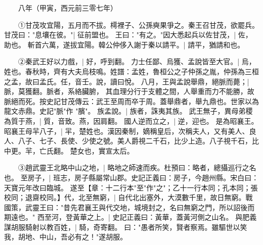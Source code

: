 　　八年（甲寅，西元前三零七年）

　　①甘茂攻宜陽，五月而不拔。樗裡子、公孫奭果爭之。秦王召甘茂，欲罷兵。甘茂曰："息壤在彼。"|{
	征前盟也。
	}
王曰："有之。"因大悉起兵以佐甘茂，|{
	佐，助也。
	}
斬首六萬，遂拔宜陽。韓公仲侈入謝于秦以請平。|{
	請平，猶請和也。
	}

　　②秦武王好以力戲，|{
	好，呼到翻。
	}
力士任鄙、烏獲、孟說皆至大官。|{
	烏，姓也。春秋時，齊有大夫烏枝鳴。姓譜：孟姓，魯桓公之子仲孫之胤，仲孫為三桓之孟，故曰孟氏。任，音壬。說，讀曰悅。
	}
八月，王與孟說舉鼎，絕脈而薨；|{
	脈，莫獲翻。脈者，系絡臟腑， 其血理分行于支體之間，人舉重而力不能勝，故脈絕而死。按史記甘茂傳云：武王至周而卒于周。蓋舉鼎者，舉九鼎也。世家以為龍文赤鼎。史記"脈"作 "臏"。
	}
族孟說。|{
	族者，誅夷其族。
	}
武王無子，異母弟稷為質于燕，|{
	質，音致。燕，因肩翻。
	}
國人逆而立之，|{
	逆，迎也。
	}
是為昭襄王。昭襄王母羋八子，|{
	羋，楚姓也。漢因秦制，嫡稱皇后，次稱夫人，又有美人、良人、八子、七子、長使、少使之號。美人爵視二千石，比少上造。八子視千石，比中更。羋，亡氏翻。
	}
楚女也，實宣太后。

　　③趙武靈王北略中山之地，|{
	略地之師速而疾。杜預曰：略者，總攝巡行之名也。
	}
至房子，|{
	班志，房子縣屬常山郡。史記正義曰：房子，今趙州縣。宋白曰：天寶元年改曰臨城。
	}
遂至【章：十二行本"至"作"之"；乙十一行本同；孔本同；張校同；退齋校同。】代，北至無窮，|{
	自代北出塞外，大漠數千里，故日無窮。戰國策，武靈王曰："昔先君襄王與代交地，城境封之，名曰無窮之門，所以詔後而期遠也。"
	}
西至河，登黃華之上。|{
	史記正義曰：黃華，蓋黃河側之山名。
	}
與肥義謀胡服騎射以教百姓，|{
	騎，奇寄翻。
	}
曰："愚者所笑，賢者察焉。雖驅世以笑我，胡地、中山，吾必有之！"遂胡服。

